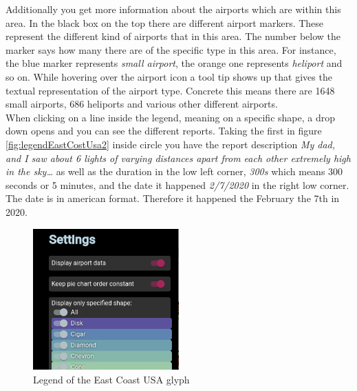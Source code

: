 \documentclass{article}
\begin{document}
Additionally you get more information about the airports which are within this area. In the 
black box on the top there are different airport markers. These represent the different kind of airports
that in this area. The number below the marker says how many there are of the specific type
in this area. For instance, the blue marker represents \textit{small airport}, the orange
one represents \textit{heliport} and so on. While hovering over the airport icon a tool tip
shows up that gives the textual representation of the airport type. Concrete this means there are 
1648 small airports, 686 heliports and various other different airports. 
\\
When clicking on a line inside the legend, meaning on a specific shape, a drop down opens and you
can see the different reports. Taking the first in figure \ref{fig:legendEastCostUsa2} inside circle
you have the report description 
\textit{My dad, and I saw about 6 lights of varying distances apart from each other extremely high in the sky…}
as well as the duration in the low left corner, \textit{300s} which means 300 seconds 
or 5 minutes, and the date it happened \textit{2/7/2020} in the right low corner. The date is in 
american format. Therefore it happened the February the 7th in 2020.
\\
\newpage
\begin{figure} 
    \centering
    \includegraphics[width=0.5\textwidth]{SettingsTap}
    \caption{Legend of the East Coast USA glyph}
    \label{fig:SettingsTap}
\end{figure}
\end{document}
